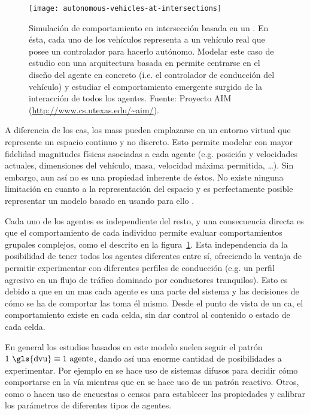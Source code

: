 \begin{figure}[t]
	\centering
	\texttt{[image: autonomous-vehicles-at-intersections]}
	\caption[Simulación de comportamiento en intersección basada en un ]{Simulación de comportamiento en intersección basada en un . En ésta, cada uno de los vehículos representa a un vehículo real que posee un controlador para hacerlo autónomo. Modelar este caso de estudio con una arquitectura basada en  permite centrarse en el diseño del agente en concreto (i.e. el controlador de conducción del vehículo) y estudiar el comportamiento emergente surgido de la interacción de todos los agentes. Fuente: Proyecto AIM (\url{http://www.cs.utexas.edu/~aim/}).}
	\label{fig:autonomous-vehicles-at-intersections}
\end{figure}

A diferencia de los \acp{ca}, los \acp{mas} pueden emplazarse en un entorno virtual que represente un espacio continuo y no discreto. Esto permite modelar con mayor fidelidad magnitudes físicas asociadas a cada agente (e.g. posición y velocidades actuales, dimensiones del vehículo, masa, velocidad máxima permitida, \ldots). Sin embargo, aun así no es una propiedad inherente de éstos. No existe ninguna limitación en cuanto a la representación del espacio y es perfectamente posible representar un modelo basado en  usando para ello .

Cada uno de los agentes es independiente del resto, y una consecuencia directa es que el comportamiento de cada individuo permite evaluar comportamientos grupales complejos, como el descrito en la figura~\ref{fig:autonomous-vehicles-at-intersections}. Esta independencia da la posibilidad de tener todos los agentes diferentes entre sí, ofreciendo la ventaja de permitir experimentar con diferentes perfiles de conducción (e.g. un perfil agresivo en un flujo de tráfico dominado por conductores tranquilos). Esto es debido a que en un \ac{mas} cada agente es una parte del sistema y las decisiones de cómo se ha de comportar las toma él mismo. Desde el punto de vista de un \ac{ca}, el comportamiento existe en cada celda, sin dar control al contenido o estado de cada celda.

En general los estudios basados en este modelo suelen seguir el patrón $1 \text{ \gls{dvu}} \equiv 1 \text{ agente}$, dando así una enorme cantidad de posibilidades a experimentar. Por ejemplo en \cite{Das} se hace uso de sistemas difusos para decidir cómo comportarse en la vía mientras que en \cite{Ehlert2001} se hace uso de un patrón reactivo. Otros, como \cite{Dia2002} o \cite{Balmer} hacen uso de encuestas o censos para establecer las propiedades y calibrar los parámetros de diferentes tipos de agentes.

